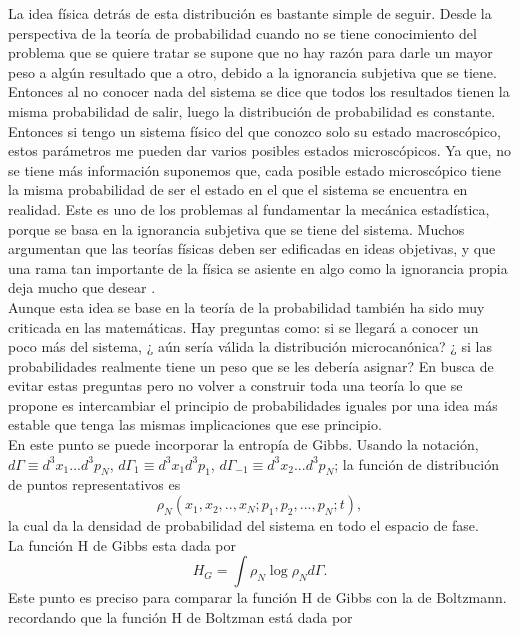 La idea física detrás de esta distribución es bastante simple de seguir. Desde la perspectiva de la teoría de probabilidad cuando no se tiene conocimiento del problema que se quiere tratar se supone que no hay razón para darle un mayor peso a algún resultado que a otro, debido a la ignorancia subjetiva que se tiene. Entonces al no conocer nada del sistema se dice que todos los resultados tienen la misma probabilidad de salir, luego la distribución de probabilidad es constante. 
\\
Entonces si tengo un sistema físico del que conozco solo su estado macroscópico, estos parámetros me pueden dar varios posibles estados microscópicos. Ya que, no  se tiene más información suponemos que, cada posible estado microscópico tiene la misma probabilidad de ser el estado en el que el sistema se encuentra en realidad. Este es uno de los problemas al fundamentar la mecánica estadística, porque se basa en la ignorancia subjetiva que se tiene del sistema. Muchos argumentan que las teorías físicas deben ser edificadas en ideas objetivas, y que una rama tan importante de la física se asiente en algo como la ignorancia propia deja mucho que desear \cite{Penrose}.
\\
Aunque esta idea se base en la teoría de la probabilidad también ha sido muy criticada en las matemáticas. Hay preguntas como: si se llegará a conocer un poco más del sistema, ¿ aún sería válida la distribución microcanónica? ¿ si las probabilidades realmente tiene un peso que se les debería asignar? En busca de evitar estas preguntas pero no volver a construir toda una teoría lo que se propone es intercambiar el principio de probabilidades iguales por una idea más estable que tenga las mismas implicaciones que ese principio.
\\
En este punto se puede incorporar la entropía de Gibbs. Usando la notación, $d\Gamma \equiv d^{3}x_{1}...d^{3}p_{N}$, $d\Gamma_{1} \equiv d^{3}x_{1}d^{3}p_{1}$, $d\Gamma_{-1} \equiv d^{3}x_{2}...d^{3}p_{N}$; la función de distribución de puntos representativos es
\begin{equation}
\rho_{N}(x_{1},x_{2},..,x_{N};p_{1},p_{2},...,p_{N};t),
\end{equation}
la cual da la densidad de probabilidad del sistema en todo  el espacio de fase. 
\\
La función H de Gibbs esta dada por
\begin{equation}
H_{G}= \int \rho_{N} \log \rho_{N} d \Gamma.
\end{equation}
Este punto es preciso para comparar la función H de Gibbs con la de Boltzmann. recordando que la función H de Boltzman está dada por 

